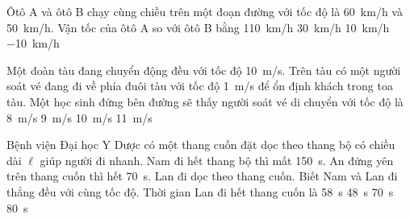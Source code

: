 \begin{ex}
	Ôtô A và ôtô B chạy cùng chiều trên một đoạn đường với tốc độ là \SI{60}{\kilo\meter/\hour} và \SI{50}{\kilo\meter/\hour}. Vận tốc của ôtô A so với ôtô B bằng
	\choice
	{\SI{110}{\kilo\meter/\hour}}
	{\SI{30}{\kilo\meter/\hour}}
	{\True \SI{10}{\kilo\meter/\hour}}
	{\SI{-10}{\kilo\meter/\hour}}
	\loigiai{}
\end{ex}

\begin{ex}
	Một đoàn tàu đang chuyển động đều với tốc độ \SI{10}{\meter/\second}. Trên tàu có một người soát vé đang đi về phía đuôi tàu với tốc độ \SI{1}{\meter/\second} để ổn định khách trong toa tàu. Một học sinh đứng bên đường sẽ thấy người soát vé di chuyển với tốc độ là
	\choice
	{\SI{8}{\meter/\second}}
	{\True \SI{9}{\meter/\second}}
	{\SI{10}{\meter/\second}}
	{\SI{11}{\meter/\second}}
	\loigiai{}
\end{ex}

\begin{ex}
	Bệnh viện Đại học Y Dược có một thang cuốn đặt dọc theo thang bộ có chiều dài $\ell$ giúp người đi nhanh. Nam đi hết thang bộ thì mất \SI{150}{\second}. An đứng yên trên thang cuốn thì hết \SI{70}{\second}. Lan đi dọc theo thang cuốn. Biết Nam và Lan đi thẳng đều với cùng tốc độ. Thời gian Lan đi hết thang cuốn là
	\choice
	{\SI{58}{\second}}
	{\True \SI{48}{\second}}
	{\SI{70}{\second}}
	{\SI{80}{\second}}
	\loigiai{}
\end{ex}

